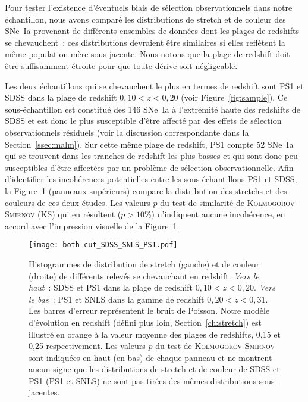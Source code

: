 \documentclass[../main/main.tex]{subfiles}
\begin{document}
Pour tester l'existence d'éventuels biais de sélection observationnels dans
notre échantillon, nous avons comparé les distributions de stretch et de couleur
des SNe~Ia provenant de différents ensembles de données dont les plages de
redshifts se chevauchent~: ces distributions devraient être similaires si elles
reflètent la même population mère sous-jacente. Nous notons que la plage de
redshift doit être suffisamment étroite pour que toute dérive soit négligeable.

Les deux échantillons qui se chevauchent le plus en termes de redshift sont PS1
et SDSS dans la plage de redshift $0,10 < z < 0,20$ (voir
Figure~\ref{fig:sample}). Ce sous-échantillon est constitué des 146 SNe~Ia à
l'extrémité haute des redshifts de SDSS et est donc le plus susceptible d'être
affecté par des effets de sélection observationnels résiduels (voir la
discussion correspondante dans la Section~\ref{ssec:malm}). Sur cette même plage
de redshift, PS1 compte 52 SNe~Ia qui se trouvent dans les tranches de redshift
les plus basses et qui sont donc peu susceptibles d'être affectées par un
problème de sélection observationnelle. Afin d'identifier les incohérences
potentielles entre les sous-échantillons PS1 et SDSS, la Figure~\ref{fig:testvl}
(panneaux supérieurs) compare la distribution des stretchs et des couleurs de
ces deux études. Les valeurs $p$ du test de similarité de
\textsc{Kolmogorov-Smirnov} (KS) qui en résultent ($p > 10\%$) n'indiquent
aucune incohérence, en accord avec l'impression visuelle de la
Figure~\ref{fig:testvl}.

\begin{figure}[ht]
    \centering
    \texttt{[image: both-cut\_SDSS\_SNLS\_PS1.pdf]}
    \captionsetup{justification=centering}
    \caption{Histogrammes de distribution de stretch (gauche) et de couleur
        (droite) de différents relevés se chevauchant en redshift. \textit{Vers
        le haut}~: SDSS et PS1 dans la plage de redshift $0,10 < z < 0,20$.
        \textit{Vers le bas}~: PS1 et SNLS dans la gamme de redshift $0,20 < z <
        0,31$. Les barres d'erreur représentent le bruit de Poisson. Notre
        modèle d'évolution en redshift (défini plus loin,
        Section~\ref{ch:stretch}) est illustré en orange à la valeur moyenne des
        plages de redshifts, 0,15 et 0,25 respectivement. Les valeurs $p$ du
        test de \textsc{Kolmogorov-Smirnov} sont indiquées en haut (en bas) de
        chaque panneau et ne montrent aucun signe que les distributions de
        stretch et de couleur de SDSS et PS1 (PS1 et SNLS) ne sont pas tirées
    des mêmes distributions sous-jacentes.}
    \label{fig:testvl}
\end{figure}
\end{document}
